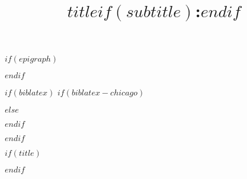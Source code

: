 
\usepackage{etoolbox}


\usepackage{fancyhdr}
\setlength{\headheight}{0.25in}
\renewcommand{\headrulewidth}{0pt}  %
\renewcommand{\footrulewidth}{0pt}



\pagestyle{normal}


$if(epigraph)$
\usepackage{epigraph}
\renewcommand{\epigraphsize}{\footnotesize}
\setlength{\epigraphrule}{0em}
\setlength{\beforeepigraphskip}{0em}
\setlength{\afterepigraphskip}{1em}
$endif$

$if(biblatex)$
$if(biblatex-chicago)$
\usepackage[$if(biblio-style)$$biblio-style$,$endif$$for(biblatexoptions)$$biblatexoptions$$sep$,$endfor$]{biblatex-chicago}
$else$
\usepackage[$if(biblio-style)$style=$biblio-style$,$endif$$for(biblatexoptions)$$biblatexoptions$$sep$,$endfor$]{biblatex}
$endif$

\setlength\bibitemsep{0pt}  %
\setlength\bibhang{\parindent}  %




\pretocmd{\printbibliography}{\clearpage}{}{}
$endif$

\usepackage{authblk}
\renewcommand*{\Authsep}{, }
\renewcommand*{\Authand}{ and }
\renewcommand*{\Authands}{, and }
\renewcommand*{\Affilfont}{\normalsize}
\renewcommand*{\Authfont}{\normalsize}

$if(title)$
\title{$title$$if(subtitle)$:$endif$}
$endif$

